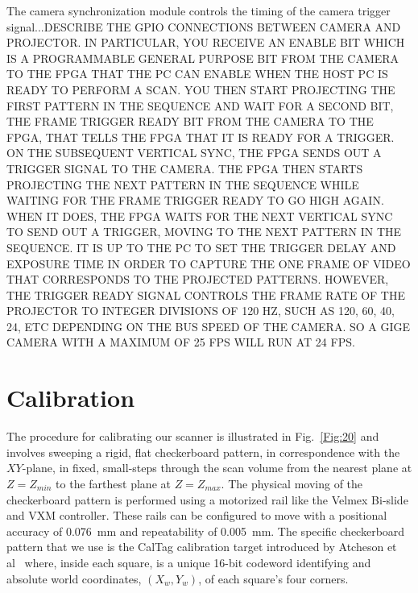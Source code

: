 \documentclass[]{spie}  %
\begin{document}
The camera synchronization module controls the timing of the camera trigger signal...DESCRIBE THE GPIO CONNECTIONS BETWEEN CAMERA AND PROJECTOR.  IN PARTICULAR, YOU RECEIVE AN ENABLE BIT WHICH IS A PROGRAMMABLE GENERAL PURPOSE BIT FROM THE CAMERA TO THE FPGA THAT THE PC CAN ENABLE WHEN THE HOST PC IS READY TO PERFORM A SCAN.  YOU THEN START PROJECTING THE FIRST PATTERN IN THE SEQUENCE AND WAIT FOR A SECOND BIT, THE FRAME TRIGGER READY BIT FROM THE CAMERA TO THE FPGA, THAT TELLS THE FPGA THAT IT IS READY FOR A TRIGGER.  ON THE SUBSEQUENT VERTICAL SYNC, THE FPGA SENDS OUT A TRIGGER SIGNAL TO THE CAMERA.  THE FPGA THEN STARTS PROJECTING THE NEXT PATTERN IN THE SEQUENCE WHILE WAITING FOR THE FRAME TRIGGER READY TO GO HIGH AGAIN.  WHEN IT DOES, THE FPGA WAITS FOR THE NEXT VERTICAL SYNC TO SEND OUT A TRIGGER, MOVING TO THE NEXT PATTERN IN THE SEQUENCE.  IT IS UP TO THE PC TO SET THE TRIGGER DELAY AND EXPOSURE TIME IN ORDER TO CAPTURE THE ONE FRAME OF VIDEO THAT CORRESPONDS TO THE PROJECTED PATTERNS.  HOWEVER, THE TRIGGER READY SIGNAL CONTROLS THE FRAME RATE OF THE PROJECTOR TO INTEGER DIVISIONS OF 120 HZ, SUCH AS 120, 60, 40, 24, ETC DEPENDING ON THE BUS SPEED OF THE CAMERA.  SO A GIGE CAMERA WITH A MAXIMUM OF 25 FPS WILL RUN AT 24 FPS. 

\section{Calibration}
The procedure for calibrating our scanner is illustrated in Fig.~\ref{Fig:20} and involves sweeping a rigid, flat checkerboard pattern, in correspondence with the $XY$-plane, in fixed, small-steps through the scan volume from the nearest plane at $Z = Z_{min}$ to the farthest plane at $Z = Z_{max}$.  The physical moving of the checkerboard pattern is performed using a motorized rail like the Velmex Bi-slide and VXM controller.  These rails can be configured to move with a positional accuracy of 0.076~mm and repeatability of 0.005~mm.  The specific checkerboard pattern that we use is the CalTag calibration target introduced by Atcheson et al~\cite{??} where, inside each square, is a unique 16-bit codeword identifying and absolute world coordinates,  $(X_w,Y_w)$, of each square's four corners.
\end{document}
